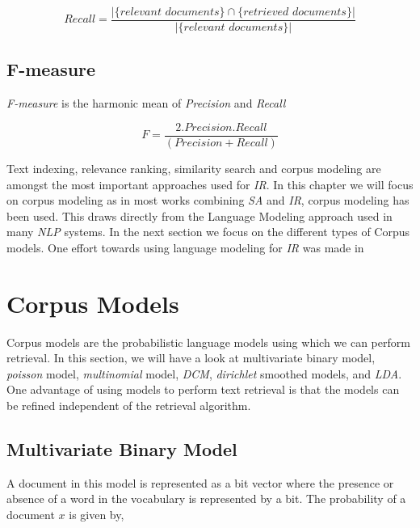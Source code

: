 \begin{equation}
 Recall = \frac{|\{\textit{relevant documents}\} \cap \{\textit{retrieved documents}\}|}{|\{\textit{relevant documents}\}|}
\end{equation}

\subsection*{F-measure}

\textit{F-measure} is the harmonic mean of \textit{Precision} and \textit{Recall}

\begin{equation}
 F = \frac{2.Precision.Recall}{(Precision+Recall)}
\end{equation}

\par

Text indexing, relevance ranking, similarity search and corpus modeling are amongst the most important approaches used for 
\textit{IR}. In this chapter we will focus on corpus modeling as in most works combining \textit{SA} and \textit{IR}, corpus modeling has been used. 
This draws directly from the Language Modeling approach used in many \textit{NLP} systems. In the next section we focus on the different
types of Corpus models. One effort towards using language modeling for \textit{IR} was made in \citep*{ponte1998language}

\section{Corpus Models}

Corpus models are the probabilistic language models using which we can perform retrieval. In this section, we will have a look 
at multivariate binary model, \textit{poisson} model, \textit{multinomial} model, \textit{DCM}, \textit{dirichlet} smoothed models, and \textit{LDA}. 
One advantage of using models to perform text retrieval is that the models can be refined independent of the retrieval algorithm. 

\subsection{Multivariate Binary Model}

A document in this model is represented as a bit vector where the presence or absence of a word in the vocabulary is represented 
by a bit. The probability of a document \(x\) is given by,

